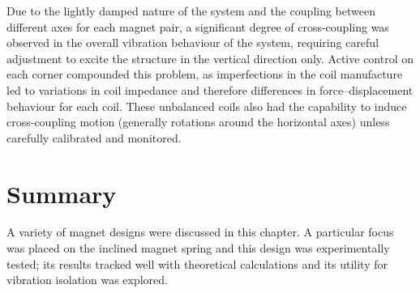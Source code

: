 \documentclass[11pt,a4paper]{memoir}
\begin{document}
Due to the lightly damped nature of the system and the coupling between different axes for each magnet pair, a significant degree of cross-coupling was observed in the overall vibration behaviour of the system, requiring careful adjustment to excite the structure in the vertical direction only.
Active control on each corner compounded this problem, as imperfections in the coil manufacture led to variations in coil impedance and therefore differences in force--displacement behaviour for each coil.
These unbalanced coils also had the capability to induce cross-coupling motion (generally rotations around the horizontal axes) unless carefully calibrated and monitored.

\section{Summary}

A variety of magnet designs were discussed in this chapter.
A particular focus was placed on the inclined magnet spring and this design was experimentally tested; its results tracked well with theoretical calculations and its utility for vibration isolation was explored.
\end{document}
